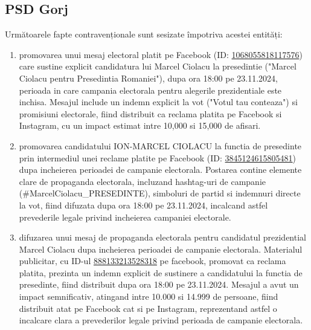 \documentclass[a4paper,12pt]{article}
\begin{document}
\vspace{0.5cm}

\subsection{PSD Gorj}
Următoarele fapte contravenționale sunt sesizate împotriva acestei entități:

\begin{enumerate}[leftmargin=*, label=\arabic*.)]
    \item promovarea unui mesaj electoral platit pe Facebook (ID: \href{https://www.facebook.com/ads/library/?id=1068055818117576}{1068055818117576}) care sustine explicit candidatura lui Marcel Ciolacu la presedintie ("Marcel Ciolacu pentru Presedintia Romaniei"), dupa ora 18:00 pe 23.11.2024, perioada in care campania electorala pentru alegerile prezidentiale este inchisa. Mesajul include un indemn explicit la vot ("Votul tau conteaza") si promisiuni electorale, fiind distribuit ca reclama platita pe Facebook si Instagram, cu un impact estimat intre 10,000 si 15,000 de afisari.
    \item promovarea candidatului ION-MARCEL CIOLACU la functia de presedinte prin intermediul unei reclame platite pe Facebook (ID: \href{https://www.facebook.com/ads/library/?id=3845124615805481}{3845124615805481}) dupa incheierea perioadei de campanie electorala. Postarea contine elemente clare de propaganda electorala, incluzand hashtag-uri de campanie (\#MarcelCiolacu\_PRESEDINTE), simboluri de partid si indemnuri directe la vot, fiind difuzata dupa ora 18:00 pe 23.11.2024, incalcand astfel prevederile legale privind incheierea campaniei electorale.
    \item difuzarea unui mesaj de propaganda electorala pentru candidatul prezidential Marcel Ciolacu dupa incheierea perioadei de campanie electorala. Materialul publicitar, cu ID-ul \href{https://www.facebook.com/ads/library/?id=888133213528318}{888133213528318} pe facebook, promovat ca reclama platita, prezinta un indemn explicit de sustinere a candidatului la functia de presedinte, fiind distribuit dupa ora 18:00 pe 23.11.2024. Mesajul a avut un impact semnificativ, atingand intre 10.000 si 14.999 de persoane, fiind distribuit atat pe Facebook cat si pe Instagram, reprezentand astfel o incalcare clara a prevederilor legale privind perioada de campanie electorala.
\end{enumerate}

\vspace{0.5cm}
\end{document}
